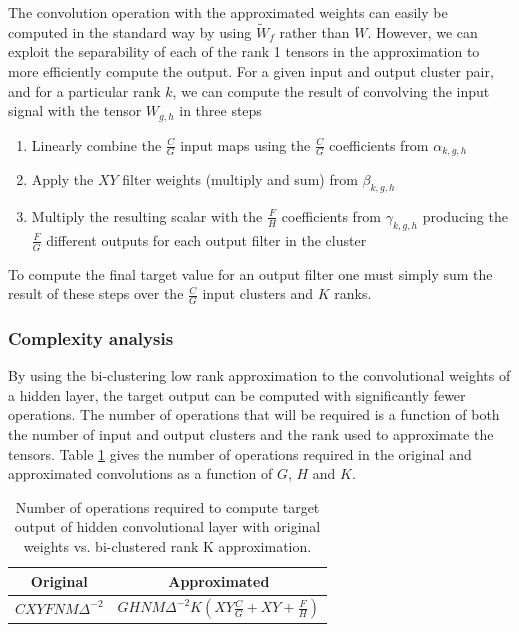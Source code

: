 The convolution operation with the approximated weights can easily be computed in the standard way by using $\tilde{W}_f$ rather than $W$. However, we can exploit the separability of each of the rank 1 tensors in the approximation to more efficiently compute the output. For a given input and output cluster pair, and for a particular rank $k$, we can compute the result of convolving the input signal with the tensor $W_{g,h}$ in three steps
\begin{enumerate}
\item Linearly combine the $\frac{C}{G}$ input maps using the $\frac{C}{G}$ coefficients from $\alpha_{k, g, h}$
\item Apply the $XY$ filter weights (multiply and sum) from $\beta_{k,g,h}$
\item Multiply the resulting scalar with the $\frac{F}{H}$ coefficients from $\gamma_{k,g,h}$ producing the $\frac{F}{G}$ different outputs for each output filter in the cluster 
\end{enumerate}

To compute the final target value for an output filter one must simply sum the result of these steps over the $\frac{C}{G}$ input clusters and $K$ ranks.

\subsubsection{Complexity analysis}
By using the bi-clustering low rank approximation to the convolutional weights of a hidden layer, the target output can be computed with significantly fewer operations. The number of operations that will be required is a function of both the number of input and output clusters and the rank used to approximate the tensors. Table \ref{biclustering_ops} gives the number of operations required in the original and approximated convolutions as a function of $G$, $H$ and $K$. 

\begin{table}[h]
\tiny
\parbox{\linewidth}{
\centering
\begin{tabular}{cc}
\hline
Original & Approximated \\
\hline
$C X Y F N M \Delta^{-2}$  & $G H N M \Delta^{-2} K (X Y \frac{C}{G} + X Y + \frac{F}{H} )$ \\
\hline
\end{tabular}
\caption{Number of operations required to compute target output of hidden convolutional layer with original weights vs. bi-clustered rank K approximation.}
\label{biclustering_ops}
}
\end{table}

